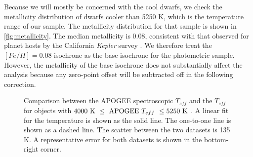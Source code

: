 \documentclass[manuscript]{aastex6}
\newcommand{\Kepler}{\mbox{\textit{Kepler}}}
\newcommand{\Teff}{\ensuremath{T_{eff}}}
\begin{document}
\begin{figure*}[htb]
    \centering
    \caption{\emph{Left:} Metallicity distribution of the \Kepler{} cool 
        dwarfs in the APOGEE sample, selected as having 
        \(\Teff < 5250 \textrm{ K }\) and a luminosity less than 1.3 mag above 
        the single-star sequence. The 
        thick black line denotes the median metallicity while the thin black 
        lines denote the 1-\(\sigma\) confidence intervals. A vertical dotted
        line at [Fe/H]=-0.3 denotes the metallicity beneath which the empirical correction is
        correction is poorly constrained due to too few metal-poor stars. 
        \emph{Right:} The vertical displacement caused by assuming a single 
        metallicity isochrone.  The blue line represents the difference between
        the derived \(M_K\) assuming the median field metallicity and that for
        the true metallicity. The orange line includes our empirical shape
        correction for metallicity, which removes most of the predicted width.
        The vertical dotted line shows the metallicity beneath which the 
    empirical correction is unconstrained.}\label{fig:metallicity}
\end{figure*}

Because we will mostly be concerned with the cool dwarfs, we check the
metallicity distribution of dwarfs cooler than 5250 K, which is the 
temperature range of our sample. The metallicity distribution for that
sample is shown in \cref{fig:metallicity}. The median metallicity is 
0.08, consistent with that observed for planet hosts by 
the California \Kepler{} survey \citep{Petigura17}.  We therefore treat the \([Fe/H] =
0.08\) isochrone as the base isochrone for the photometric sample. However, the
metallicity of the base isochrone does not substantially affect the analysis
because any zero-point offset will be subtracted off in the following
correction.

\begin{figure}[htb]
    \centering
    \caption{Comparison between the APOGEE spectroscopic \Teff{} and the
        \citet{Pinsonneault12} \Teff{} for objects with \(4000 \textrm{ K } \le
    \textrm{ APOGEE \Teff{} } \le 5250 \textrm{ K }\). A linear fit for the
    temperature is shown as the solid line. The one-to-one line is shown
    as a dashed line. The scatter between the two datasets is 135 K. A 
    representative error for both datasets is shown in the bottom-right 
corner.}\label{fig:teffdiff}
\end{figure}
\end{document}
